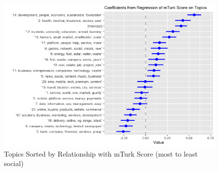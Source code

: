 \documentclass[12pt]{article}
\begin{document}
\begin{figure} [!htb]
\centering
\includegraphics[scale=0.6]{topics_coefplot}
\caption{Topics Sorted by Relationship with mTurk Score (most to least social)}
\end{figure}
\end{document}
